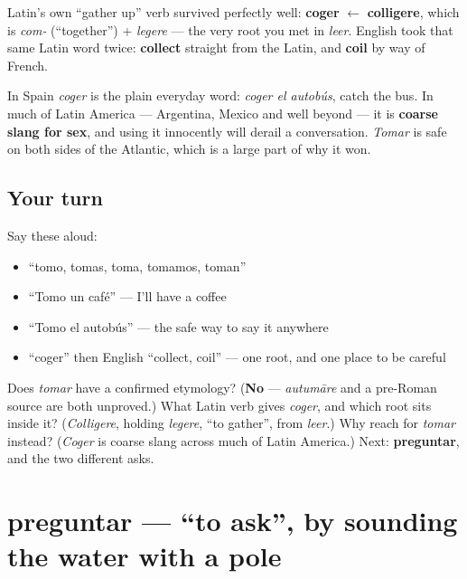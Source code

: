 \begin{culture}
Latin's own \textquotedblleft{}gather up\textquotedblright{} verb survived perfectly well: \textbf{coger} $\leftarrow$ \textbf{colligere}, which is \emph{com-} (\textquotedblleft{}together\textquotedblright{}) + \emph{legere} — the very root you met in \emph{leer}. English took that same Latin word twice: \textbf{collect} straight from the Latin, and \textbf{coil} by way of French.

In Spain \emph{coger} is the plain everyday word: \emph{coger el autobús}, catch the bus. In much of Latin America — Argentina, Mexico and well beyond — it is \textbf{coarse slang for sex}, and using it innocently will derail a conversation. \emph{Tomar} is safe on both sides of the Atlantic, which is a large part of why it won.
\end{culture}

\subsection*{Your turn}
Say these aloud:

\begin{itemize}
\raggedright
  \item \textquotedblleft{}tomo, tomas, toma, tomamos, toman\textquotedblright{}
  \item \textquotedblleft{}Tomo un café\textquotedblright{} — I'll have a coffee
  \item \textquotedblleft{}Tomo el autobús\textquotedblright{} — the safe way to say it anywhere
  \item \textquotedblleft{}coger\textquotedblright{} then English \textquotedblleft{}collect, coil\textquotedblright{} — one root, and one place to be careful
\end{itemize}

\begin{tcolorbox}[breakable,colback=teal!4,colframe=teal!35!black,title={Before you move on}]
Does \emph{tomar} have a confirmed etymology? (\textbf{No} — \emph{autumāre} and a pre-Roman source are both unproved.) What Latin verb gives \emph{coger}, and which root sits inside it? (\emph{Colligere}, holding \emph{legere}, \textquotedblleft{}to gather\textquotedblright{}, from \emph{leer}.) Why reach for \emph{tomar} instead? (\emph{Coger} is coarse slang across much of Latin America.) Next: \textbf{preguntar}, and the two different asks.
\end{tcolorbox}
\section[preguntar]{preguntar — \textquotedblleft{}to ask\textquotedblright{}, by sounding the water with a pole}

